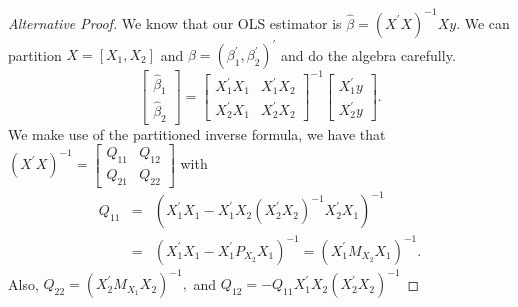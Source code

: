 \documentclass[notes=show]{beamer}
\begin{document}
\begin{frame}%

\begin{proof}[Alternative Proof]
We know that our OLS estimator is $\widehat{\beta }=\left( X^{\prime
}X\right) ^{-1}Xy.$ We can partition $X=[X_{1},X_{2}]$ and $\beta =\left(
\beta _{1}^{\prime },\beta _{2}^{\prime }\right) ^{\prime }$ and do the
algebra carefully. 
\begin{equation*}
\left[ 
\begin{array}{c}
\widehat{\beta }_{1} \\ 
\widehat{\beta }_{2}%
\end{array}%
\right] =\left[ 
\begin{array}{cc}
X_{1}^{\prime }X_{1} & X_{1}^{\prime }X_{2} \\ 
X_{2}^{\prime }X_{1} & X_{2}^{\prime }X_{2}%
\end{array}%
\right] ^{-1}\left[ 
\begin{array}{c}
X_{1}^{\prime }y \\ 
X_{2}^{\prime }y%
\end{array}%
\right] .
\end{equation*}%
We make use of the partitioned inverse formula, we have that $\left(
X^{\prime }X\right) ^{-1}=\left[ 
\begin{array}{cc}
Q_{11} & Q_{12} \\ 
Q_{21} & Q_{22}%
\end{array}%
\right] $ with 
\begin{eqnarray*}
Q_{11} &=&\left( X_{1}^{\prime }X_{1}-X_{1}^{\prime }X_{2}\left(
X_{2}^{\prime }X_{2}\right) ^{-1}X_{2}^{\prime }X_{1}\right) ^{-1} \\
&=&\left( X_{1}^{\prime }X_{1}-X_{1}^{\prime }P_{X_{2}}X_{1}\right)
^{-1}=\left( X_{1}^{\prime }M_{X_{2}}X_{1}\right) ^{-1}.
\end{eqnarray*}%
Also, $Q_{22}=\left( X_{2}^{\prime }M_{X_{1}}X_{2}\right) ^{-1},$ and $%
Q_{12}=-Q_{11}X_{1}^{\prime }X_{2}\left( X_{2}^{\prime }X_{2}\right) ^{-1}$
\end{proof}

\end{frame}%
\end{document}
